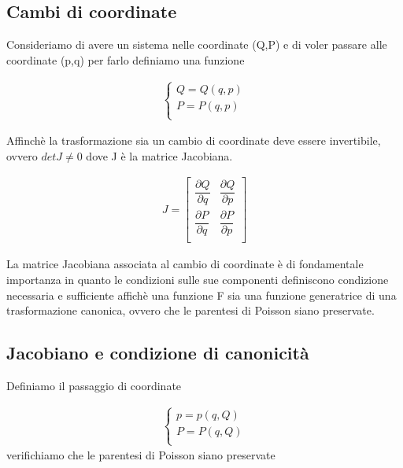 \subsection{Cambi di coordinate}

Consideriamo di avere un sistema nelle coordinate (Q,P) e di voler passare alle coordinate (p,q) per farlo definiamo una funzione

\begin{align*}
	\begin{cases}
		Q = Q(q,p)\\
		P = P(q,p)\\
	\end{cases}
\end{align*}

Affinch\`{e} la trasformazione sia un cambio di coordinate deve essere invertibile, ovvero $det J \neq 0$ dove J \`{e} la matrice Jacobiana.

\begin{align}
J = 
\left [ \begin{array}{cc}
		\dfrac{\partial Q}{\partial q} & \dfrac{\partial Q}{\partial p} \\ [0.2in]
		\dfrac{\partial P}{\partial q} & \dfrac{\partial P}{\partial p} \\
	\end{array}\right ]
\end{align}
\newline

\noindent La matrice Jacobiana associata al cambio di coordinate \`{e} di fondamentale importanza in quanto le condizioni sulle sue componenti definiscono condizione necessaria e sufficiente affich\`{e} una funzione F sia una funzione generatrice di una trasformazione canonica, ovvero che le parentesi di Poisson siano preservate.

\subsection{Jacobiano e condizione di canonicit\`{a}}
\noindent Definiamo il passaggio di coordinate 

\begin{align*}
	\begin{cases}
		p = p(q,Q)\\
		P = P(q,Q)\\
	\end{cases}
\end{align*}
verifichiamo che le parentesi di Poisson siano preservate


